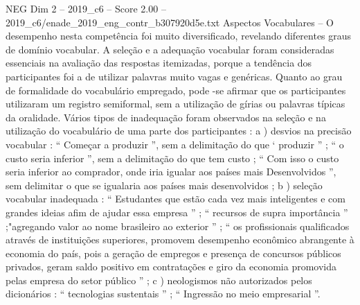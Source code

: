 \begin{textsample}{NEG Dim 2 – 2019\_c6 – Score 2.00 – 2019\_c6/enade\_2019\_eng\_contr\_b307920d5e.txt}
Aspectos Vocabulares – O desempenho nesta competência foi muito diversificado, revelando diferentes graus de domínio vocabular.
A seleção e a adequação vocabular foram consideradas essenciais na avaliação das respostas itemizadas, porque a tendência dos participantes foi a de utilizar palavras muito vagas e genéricas.
Quanto ao grau de formalidade do vocabulário empregado, pode -se afirmar que os participantes utilizaram um registro semiformal, sem a utilização de gírias ou palavras típicas da oralidade.
Vários tipos de inadequação foram observados na seleção e na utilização do vocabulário de uma parte dos participantes : a ) desvios na precisão vocabular : “ Começar a produzir ”, sem a delimitação do que ‘ produzir ” ; “ o custo seria inferior ”, sem a delimitação do que tem custo ; “ Com isso o custo seria inferior ao comprador, onde iria igualar aos países mais Desenvolvidos ”, sem delimitar o que se igualaria aos países mais desenvolvidos ; b ) seleção vocabular inadequada : “ Estudantes que estão cada vez mais inteligentes e com grandes ideias afim de ajudar essa empresa ” ; “ recursos de supra importância ” ;"agregando valor ao nome brasileiro ao exterior ” ; “ os profissionais qualificados através de instituições superiores, promovem desempenho econômico abrangente à economia do país, pois a geração de empregos e presença de concursos públicos privados, geram saldo positivo em contratações e giro da economia promovida pelas empresa do setor público ” ; c ) neologismos não autorizados pelos dicionários : “ tecnologias sustentais ” ; “ Ingressão no meio empresarial ”.

\end{textsample}
